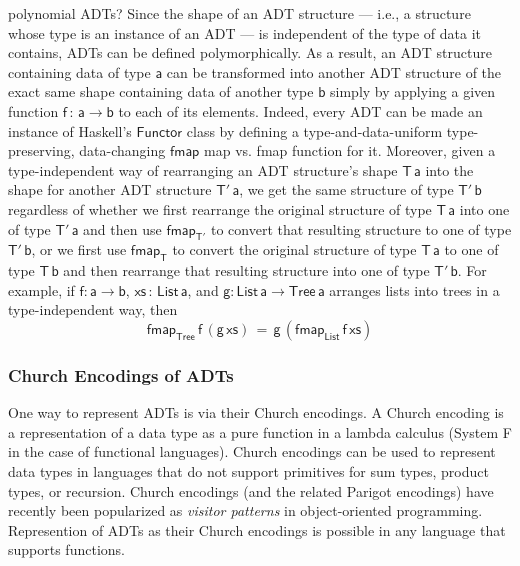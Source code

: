 \documentclass[acmsmall,screen,review,anonymous]{acmart}
\theoremstyle{definition}
\begin{document}
{\color{blue} polynomial ADTs?} Since the shape of an ADT structure
--- i.e., a structure whose type is an instance of an ADT --- is
independent of the type of data it contains, ADTs can be defined
polymorphically. As a result, an ADT structure containing data of type
$\mathsf{a}$ can be transformed into another ADT structure of the
exact same shape containing data of another type $\mathsf{b}$ simply
by applying a given function $\mathsf{f \,:\,a \to b}$ to each of its
elements. Indeed, every ADT can be made an instance of Haskell's
$\mathsf{Functor}$ class by defining a type-and-data-uniform
type-preserving, data-changing $\mathsf{fmap}$ {\color{blue} map
  vs. fmap} function for it.  Moreover, given a type-independent way
of rearranging an ADT structure's shape $\mathsf{T\,a}$ into the shape
for another ADT structure $\mathsf{T'\,a}$, we get the same structure
of type $\mathsf{T'\,b}$ regardless of whether we first rearrange the
original structure of type $\mathsf{T\,a}$ into one of type
$\mathsf{T'\,a}$ and then use $\mathsf{fmap_{T'}}$ to convert that
resulting structure to one of type $\mathsf{T'\,b}$, or we first use
$\mathsf{fmap_T}$ to convert the original structure of type
$\mathsf{T\,a}$ to one of type $\mathsf{T\,b}$ and then rearrange that
resulting structure into one of type $\mathsf{T'\,b}$. For example, if
$\mathsf{f : a \to b}$, $\mathsf{xs \,:\,List\,a}$, and $\mathsf{g :
  List\,a\to Tree\,a}$ arranges lists into trees in a type-independent
way, then
\[\mathsf{fmap_{Tree}\,f\,(g \, xs) \,=\, g\,(fmap_{List}\,f\,xs)}\]

\subsubsection{Church Encodings of ADTs}

One way to represent ADTs is via their Church encodings. A Church
encoding is a representation of a data type as a pure function in a
lambda calculus (System F in the case of functional languages). Church
encodings can be used to represent data types in languages that do not
support primitives for sum types, product types, or recursion.
{\color{blue} Church encodings (and the related Parigot encodings)
  have recently been popularized as {\em visitor patterns} in
  object-oriented programming.} Represention of ADTs as their Church
encodings is possible in any language that supports functions.
\end{document}
